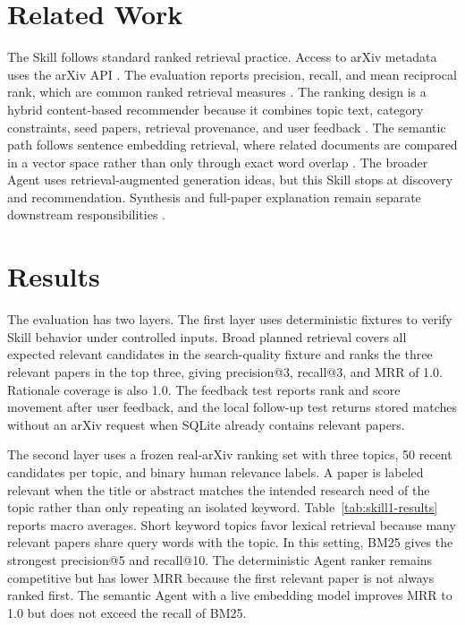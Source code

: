 \documentclass{article}
\begin{document}
\section{Related Work}

The Skill follows standard ranked retrieval practice. Access to arXiv metadata uses the arXiv API \citep{arxivapi}. The evaluation reports precision, recall, and mean reciprocal rank, which are common ranked retrieval measures \citep{manning2008}. The ranking design is a hybrid content-based recommender because it combines topic text, category constraints, seed papers, retrieval provenance, and user feedback \citep{burke2002}. The semantic path follows sentence embedding retrieval, where related documents are compared in a vector space rather than only through exact word overlap \citep{reimers2019}. The broader Agent uses retrieval-augmented generation ideas, but this Skill stops at discovery and recommendation. Synthesis and full-paper explanation remain separate downstream responsibilities \citep{lewis2020}.

\section{Results}

The evaluation has two layers. The first layer uses deterministic fixtures to verify Skill behavior under controlled inputs. Broad planned retrieval covers all expected relevant candidates in the search-quality fixture and ranks the three relevant papers in the top three, giving precision@3, recall@3, and MRR of 1.0. Rationale coverage is also 1.0. The feedback test reports rank and score movement after user feedback, and the local follow-up test returns stored matches without an arXiv request when SQLite already contains relevant papers.

The second layer uses a frozen real-arXiv ranking set with three topics, 50 recent candidates per topic, and binary human relevance labels. A paper is labeled relevant when the title or abstract matches the intended research need of the topic rather than only repeating an isolated keyword. Table~\ref{tab:skill1-results} reports macro averages. Short keyword topics favor lexical retrieval because many relevant papers share query words with the topic. In this setting, BM25 gives the strongest precision@5 and recall@10. The deterministic Agent ranker remains competitive but has lower MRR because the first relevant paper is not always ranked first. The semantic Agent with a live embedding model improves MRR to 1.0 but does not exceed the recall of BM25.
\end{document}
